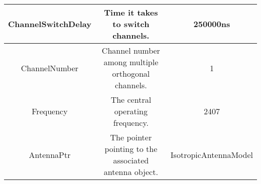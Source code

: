 \begin{longtable}{ | c | c | c |}
 ChannelSwitchDelay & \parbox[][][t]{5cm}{\vspace{6pt}\raggedright Time it takes to switch channels.} & 
                   250000ns \\ \hline 

 ChannelNumber & \parbox[][][t]{5cm}{\vspace{6pt}\raggedright Channel number among multiple orthogonal channels.}
                  & 1 \\ \hline 

 Frequency & \parbox[][][t]{5cm}{\vspace{6pt}\raggedright The central operating frequency.} & 
                   2407 \\ \hline 

 AntennaPtr & \parbox[][][t]{5cm}{\vspace{6pt}\raggedright The pointer pointing to the associated antenna object.} & 
                  IsotropicAntennaModel \\ \hline 

%
%
%
%
%
%
%
%


\end{longtable}

